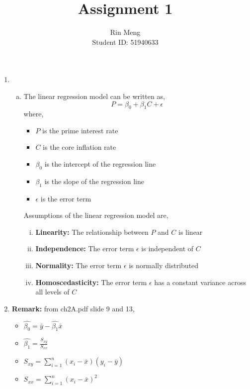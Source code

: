 \documentclass[12pt]{article}
\title{Assignment 1}
\author{Rin Meng \\ Student ID: 51940633}
\begin{document}
\maketitle

\begin{enumerate}[1.]
    \item
    \begin{enumerate}[a.]
        \item The linear regression model can be written as, 
        \[P = \beta_0 + \beta_1 C + \epsilon\]
        where,
        \begin{itemize}
            \item $P$ is the prime interest rate
            \item $C$ is the core inflation rate
            \item $\beta_0$ is the intercept of the regression line
            \item $\beta_1$ is the slope of the regression line
            \item $\epsilon$ is the error term
        \end{itemize}
        Assumptions of the linear regression model are,
        \begin{enumerate}[i.]
            \item \textbf{Linearity:} The relationship between $P$ and $C$ is linear
            \item \textbf{Independence:} The error term $\epsilon$ is independent of $C$
            \item \textbf{Normality:} The error term $\epsilon$ is normally distributed
            \item \textbf{Homoscedasticity:} The error term $\epsilon$ has a constant variance across all levels of $C$
        \end{enumerate}
    \end{enumerate}

    \item \textbf{Remark:} from ch2A.pdf slide 9 and 13,
        \begin{itemize}
            \item $\hat{\beta_0} = \bar{y} - \hat{\beta_1}\bar{x}$
            \item $\hat{\beta_1} = \frac{S_{xy}}{S_{xx}}$
            \item $S_{xy} = \sum_{i=1}^{n} (x_i - \bar{x})(y_i - \bar{y})$
            \item $S_{xx} = \sum_{i=1}^{n} (x_i - \bar{x})^2$
        \end{itemize}
    

\end{enumerate}
\end{document}
